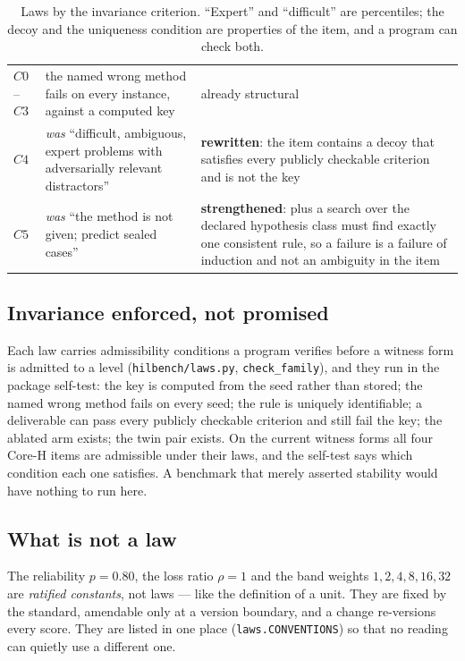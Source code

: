 \begin{table}[!htbp]
\begin{tabularx}{\textwidth}{@{}>{\raggedright\arraybackslash}p{1.1cm}>{\raggedright\arraybackslash}p{6.2cm}Y@{}}
$C0$--$C3$ & the named wrong method fails on every instance, against a computed key & already structural \\
$C4$ & \emph{was} ``difficult, ambiguous, expert problems with adversarially relevant distractors'' & \textbf{rewritten}: the item contains a decoy that satisfies every publicly checkable criterion and is not the key \\
$C5$ & \emph{was} ``the method is not given; predict sealed cases'' & \textbf{strengthened}: plus a search over the declared hypothesis class must find exactly one consistent rule, so a failure is a failure of induction and not an ambiguity in the item \\
\bottomrule
\end{tabularx}
\caption{Laws by the invariance criterion. ``Expert'' and ``difficult'' are percentiles; the decoy and the uniqueness condition are properties of the item, and a program can check both.}
\label{tab:invariance}
\end{table}

\subsection{Invariance enforced, not promised}

Each law carries admissibility conditions a program verifies before a witness form is admitted to a level (\texttt{hilbench/laws.py}, \texttt{check\_family}), and they run in the package self-test: the key is computed from the seed rather than stored; the named wrong method fails on every seed; the rule is uniquely identifiable; a deliverable can pass every publicly checkable criterion and still fail the key; the ablated arm exists; the twin pair exists. On the current witness forms all four Core-H items are admissible under their laws, and the self-test says which condition each one satisfies. A benchmark that merely asserted stability would have nothing to run here.

\subsection{What is not a law}

The reliability $p = 0.80$, the loss ratio $\rho = 1$ and the band weights $1,2,4,8,16,32$ are \emph{ratified constants}, not laws --- like the definition of a unit. They are fixed by the standard, amendable only at a version boundary, and a change re-versions every score. They are listed in one place (\texttt{laws.CONVENTIONS}) so that no reading can quietly use a different one.


